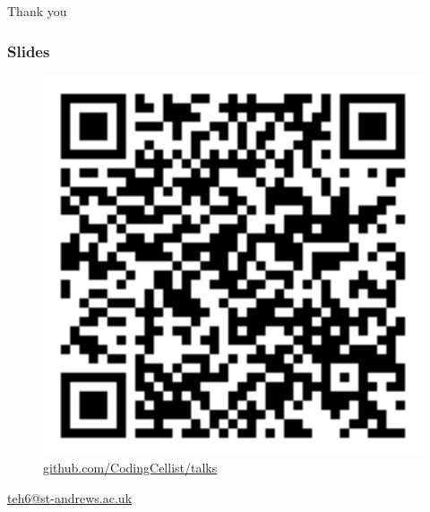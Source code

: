 \documentclass[compress,handout]{beamer}
\begin{document}
\begin{frame}

  \begin{center}
    \textcolor<1>{staDarkGreen}{\Large Thank you}
  \end{center}

\end{frame}


\begin{frame}
  \frametitle{Slides}

  \begin{center}
    \begin{figure}
      \includegraphics[width=0.35\framewidth]{qr-code.png}
      \caption{\href{https://github.com/CodingCellist/talks/tree/main/2024-03-06-spls-st-andrews}{github.com/CodingCellist/talks}}
    \end{figure}
    {\href{mailto:teh6@st-andrews.ac.uk}{\small teh6@st-andrews.ac.uk}}
    \vspace*{-10mm}
  \end{center}

\end{frame}
\end{document}

